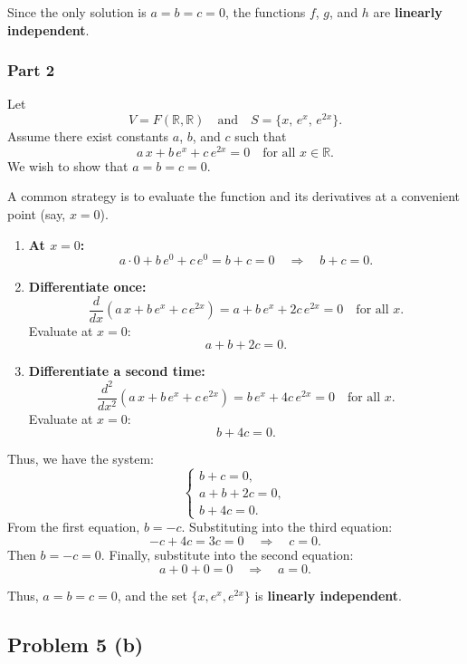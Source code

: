 \documentclass[12pt]{article}
\begin{document}
Since the only solution is \(a=b=c=0\), the functions \(f\), \(g\), and \(h\) are \textbf{linearly independent}.

\bigskip

\subsubsection*{Part 2}

Let 
\[
V=F(\mathbb{R},\mathbb{R}) \quad \text{and} \quad S=\{x,\, e^x,\, e^{2x}\}.
\]
Assume there exist constants \(a\), \(b\), and \(c\) such that
\[
a\,x + b\,e^x + c\,e^{2x} = 0 \quad \text{for all } x\in\mathbb{R}.
\]
We wish to show that \(a=b=c=0\).

\medskip

A common strategy is to evaluate the function and its derivatives at a convenient point (say, \(x=0\)).

\begin{enumerate}
    \item \textbf{At \(x=0\):}  
    \[
    a\cdot 0 + b\,e^0 + c\,e^0 = b+c = 0 \quad \Longrightarrow \quad b+c=0.
    \]
    
    \item \textbf{Differentiate once:}  
    \[
    \frac{d}{dx}\left(a\,x + b\,e^x + c\,e^{2x}\right) = a + b\,e^x + 2c\,e^{2x} = 0 \quad \text{for all } x.
    \]
    Evaluate at \(x=0\):
    \[
    a + b + 2c = 0.
    \]
    
    \item \textbf{Differentiate a second time:}  
    \[
    \frac{d^2}{dx^2}\left(a\,x + b\,e^x + c\,e^{2x}\right) = b\,e^x + 4c\,e^{2x} = 0 \quad \text{for all } x.
    \]
    Evaluate at \(x=0\):
    \[
    b + 4c = 0.
    \]
\end{enumerate}

Thus, we have the system:
\[
\begin{cases}
b + c = 0,\\[1mm]
a + b + 2c = 0,\\[1mm]
b + 4c = 0.
\end{cases}
\]
From the first equation, \(b=-c\). Substituting into the third equation:
\[
-c + 4c = 3c = 0 \quad \Longrightarrow \quad c=0.
\]
Then \(b=-c=0\). Finally, substitute into the second equation:
\[
a+0+0=0 \quad \Longrightarrow \quad a=0.
\]

Thus, \(a=b=c=0\), and the set \(\{x, e^x, e^{2x}\}\) is \textbf{linearly independent}.

\bigskip

\subsection*{Problem 5 (b)}
\end{document}
